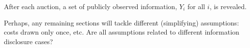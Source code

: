 After each auction, a set of publicly observed information, $Y_i$ for all $i$, is revealed.

Perhaps, any remaining sections will tackle different (simplifying) assumptions: costs drawn only once, etc. Are all assumptions related to different information disclosure cases?

